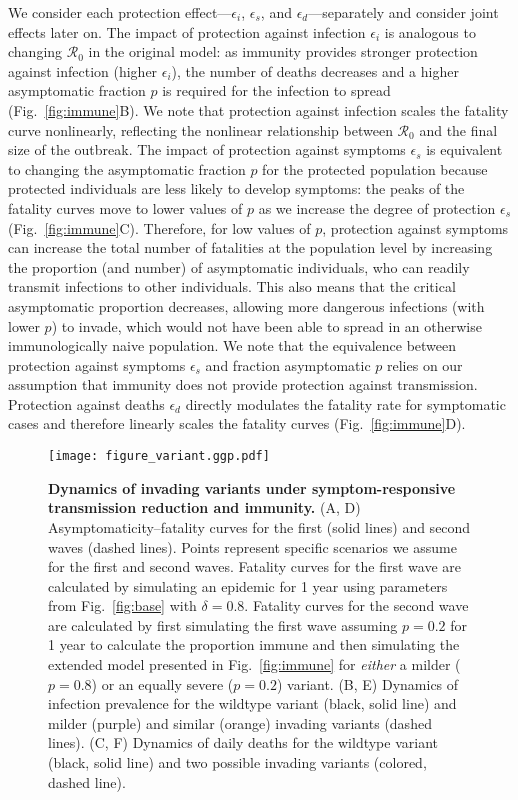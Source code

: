 \documentclass[12pt]{article}
\newcommand{\fref}[1]{Fig.~\ref{fig:#1}}
\newcommand{\RR}{\ensuremath{{\mathcal R}}\xspace}
\begin{document}
We consider each protection effect---$\epsilon_i$, $\epsilon_s$, and $\epsilon_d$---separately and consider joint effects later on.
The impact of protection against infection $\epsilon_i$ is analogous to changing $\RR_0$ in the original model: as immunity provides stronger protection against infection (higher $\epsilon_i$), the number of deaths decreases and a higher asymptomatic fraction $p$ is required for the infection to spread (\fref{immune}B).
We note that protection against infection scales the fatality curve nonlinearly, reflecting the nonlinear relationship between $\RR_0$ and the final size of the outbreak.
The impact of protection against symptoms $\epsilon_s$ is equivalent to changing the asymptomatic fraction $p$ for the protected population because protected individuals are less likely to develop symptoms:
the peaks of the fatality curves move to lower values of $p$ as we increase the degree of protection $\epsilon_s$ (\fref{immune}C).
Therefore, for low values of $p$, protection against symptoms can increase the total number of fatalities at the population level by increasing the proportion (and number) of asymptomatic individuals, who can readily transmit infections to other individuals.
This also means that the critical asymptomatic proportion decreases, allowing more dangerous infections (with lower $p$) to invade, which would not have been able to spread in an otherwise immunologically naive population.
We note that the equivalence between protection against symptoms $\epsilon_s$ and fraction asymptomatic $p$ relies on our assumption that immunity does not provide protection against transmission.
Protection against deaths $\epsilon_d$ directly modulates the fatality rate for symptomatic cases and therefore linearly scales the fatality curves (\fref{immune}D).

\begin{figure}[!ht]
\texttt{[image: figure\_variant.ggp.pdf]}
\caption{
\textbf{Dynamics of invading variants under symptom-responsive transmission reduction and immunity.}
(A, D) Asymptomaticity--fatality curves for the first (solid lines) and second waves (dashed lines).
Points represent specific scenarios we assume for the first and second waves.
Fatality curves for the first wave are calculated by simulating an epidemic for 1 year using parameters from \fref{base} with $\delta=0.8$.
Fatality curves for the second wave are calculated by first simulating the first wave assuming $p=0.2$ for 1 year to calculate the proportion immune and then simulating the extended model presented in \fref{immune} for \emph{either} a milder ($p=0.8$) or an equally severe ($p=0.2$) variant.
(B, E) Dynamics of infection prevalence for the wildtype variant (black, solid line) and milder (purple) and similar (orange) invading variants (dashed lines).
(C, F) Dynamics of daily deaths for the wildtype variant (black, solid line) and two possible invading variants (colored, dashed line).
}
\label{fig:variant}
\end{figure}
\end{document}
